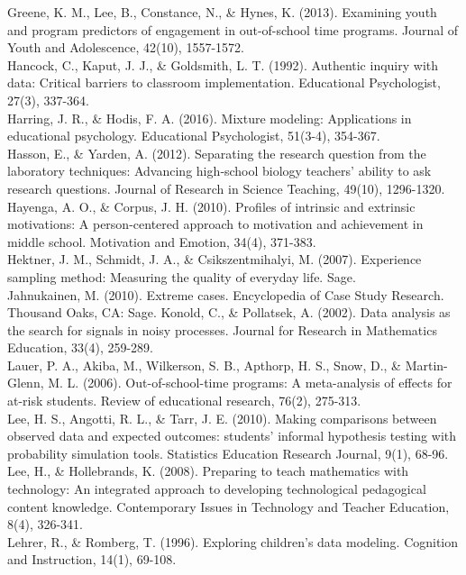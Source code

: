 \documentclass[]{msu-thesis}
\theoremstyle{definition}
\theoremstyle{definition}
\theoremstyle{definition}
\theoremstyle{remark}
\begin{document}
Greene, K. M., Lee, B., Constance, N., \& Hynes, K. (2013). Examining
youth and program predictors of engagement in out-of-school time
programs. Journal of Youth and Adolescence, 42(10), 1557-1572.\\
Hancock, C., Kaput, J. J., \& Goldsmith, L. T. (1992). Authentic inquiry
with data: Critical barriers to classroom implementation. Educational
Psychologist, 27(3), 337-364.\\
Harring, J. R., \& Hodis, F. A. (2016). Mixture modeling: Applications
in educational psychology. Educational Psychologist, 51(3-4), 354-367.\\
Hasson, E., \& Yarden, A. (2012). Separating the research question from
the laboratory techniques: Advancing high‐school biology teachers'
ability to ask research questions. Journal of Research in Science
Teaching, 49(10), 1296-1320.\\
Hayenga, A. O., \& Corpus, J. H. (2010). Profiles of intrinsic and
extrinsic motivations: A person-centered approach to motivation and
achievement in middle school. Motivation and Emotion, 34(4), 371-383.\\
Hektner, J. M., Schmidt, J. A., \& Csikszentmihalyi, M. (2007).
Experience sampling method: Measuring the quality of everyday life.
Sage.\\
Jahnukainen, M. (2010). Extreme cases. Encyclopedia of Case Study
Research. Thousand Oaks, CA: Sage. Konold, C., \& Pollatsek, A. (2002).
Data analysis as the search for signals in noisy processes. Journal for
Research in Mathematics Education, 33(4), 259-289.\\
Lauer, P. A., Akiba, M., Wilkerson, S. B., Apthorp, H. S., Snow, D., \&
Martin-Glenn, M. L. (2006). Out-of-school-time programs: A meta-analysis
of effects for at-risk students. Review of educational research, 76(2),
275-313.\\
Lee, H. S., Angotti, R. L., \& Tarr, J. E. (2010). Making comparisons
between observed data and expected outcomes: students' informal
hypothesis testing with probability simulation tools. Statistics
Education Research Journal, 9(1), 68-96.\\
Lee, H., \& Hollebrands, K. (2008). Preparing to teach mathematics with
technology: An integrated approach to developing technological
pedagogical content knowledge. Contemporary Issues in Technology and
Teacher Education, 8(4), 326-341.\\
Lehrer, R., \& Romberg, T. (1996). Exploring children's data modeling.
Cognition and Instruction, 14(1), 69-108.\\
\end{document}
